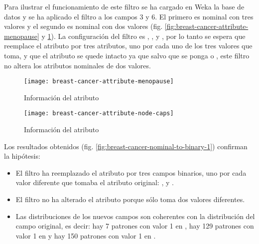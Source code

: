Para ilustrar el funcionamiento de este filtro se ha cargado en Weka la base de datos  y se ha aplicado el filtro a los campos 3 y 6. El primero es nominal con tres valores y el segundo es nominal con dos valores (fig. \ref{fig:breast-cancer-attribute-menopause} y \ref{fig:breast-cancer-attribute-node-caps}). La configuración del filtro es , ,  y , por lo tanto se espera que reemplace el atributo  por tres atributos, uno por cada uno de los tres valores que toma, y que el atributo  se quede intacto ya que salvo que se ponga  o , este filtro no altera los atributos nominales de dos valores.

\begin{figure}[ht]
    \centering
    \begin{minipage}{0.50\textwidth}
        \centering
        \texttt{[image: breast-cancer-attribute-menopause]}
        \caption{Información del atributo }
        \label{fig:breast-cancer-attribute-menopause}
    \end{minipage}\hfill
    \begin{minipage}{0.50\textwidth}
        \centering
        \texttt{[image: breast-cancer-attribute-node-caps]}
        \caption{Información del atributo }
        \label{fig:breast-cancer-attribute-node-caps}
    \end{minipage}
\end{figure}

Los resultados obtenidos (fig. \ref{fig:breast-cancer-nominal-to-binary-1}) confirman la hipótesis:
\begin{itemize}
    \item El filtro ha reemplazado el atributo  por tres campos binarios, uno por cada valor diferente que tomaba el atributo original: ,  y .
    \item El filtro no ha alterado el atributo  porque sólo toma dos valores diferentes.
    \item Las distribuciones de los nuevos campos son coherentes con la distribución del campo original, es decir: hay 7 patrones con valor 1 en , hay 129 patrones con valor 1 en  y hay 150 patrones con valor 1 en .
\end{itemize}


